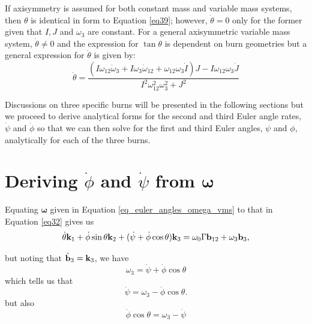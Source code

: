 If axisymmetry is assumed for both constant mass and variable mass systems, then $\theta$ is identical
in form to Equation \eqref{eq39}; however, $\dot{\theta} = 0$ only for the former
given that $I, J$ and $\omega_3$ are constant. For a general axisymmetric variable mass system,
$\dot{\theta} \neq 0$ and the expression for $\tan \theta$ is dependent on burn geometries but
a general expression for $\dot{\theta}$ is given by:
\begin{equation}
\label{eq_euler_angles_theta_dot}
\dot{\theta} = \frac{\left(I \omega_{12} \dot{\omega}_3 + I \omega_3 \dot{\omega}_{12} + \omega_{12} \omega_3 \dot{I}\right) J - I \omega_{12} \omega_3 \dot{J}}{I^2 \omega_{12}^2 \omega_3^2 + J^2}
\end{equation}

Discussions on three specific burns will be presented in the following sections but we proceed to
derive analytical forms for the second and third Euler angle rates, $\dot{\psi}$ and $\dot{\phi}$
so that we can then solve for the first and third Euler angles, $\psi$ and $\phi$, analytically
for each of the three burns.

\section{Deriving $\dot{\phi}$ and $\dot{\psi}$ from $\boldsymbol\omega$}

Equating $\boldsymbol\omega$ given in Equation \eqref{eq_euler_angles_omega_vms} to that in Equation \eqref{eq32} gives us
\begin{equation}
\label{eq_euler_angles_omega_vms_3}
\dot{\theta} {\bf k}_1 + \dot{\phi} \sin \theta {\bf k}_{2} + (\dot{\psi} + \dot{\phi} \cos \theta) {\bf k}_3 = \omega_0 \Gamma{\bf b}_{12} + \omega_3 {\bf b}_3,
\end{equation}

but noting that $\hat{\bf b}_3 = {\bf k}_3$, we have
\begin{equation}
\label{eq_euler_angles_omega_3_euler_rates}
\omega_3 = \dot\psi + \dot{\phi} \cos \theta
\end{equation}
which tells us that 
\begin{equation}
\label{eq_euler_angles_dot_psi}
\dot{\psi} = \omega_3 - \dot{\phi} \cos \theta.
\end{equation}
but also
\begin{equation}
\label{eq_euler_angles_dot_psi_cos_theta}
\dot{\phi} \cos \theta = \omega_3 - \dot{\psi}
\end{equation}

